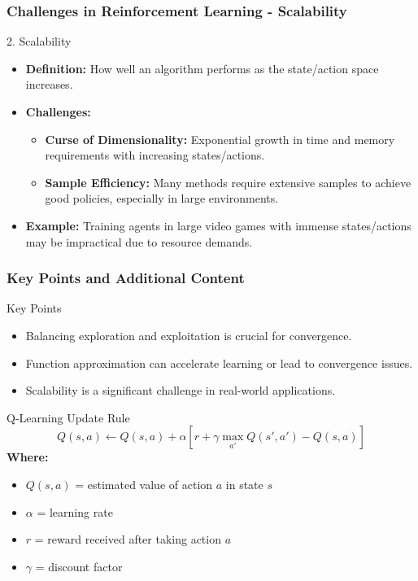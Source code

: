 \documentclass[aspectratio=169]{beamer}
\begin{document}
\begin{frame}[fragile]
    \frametitle{Challenges in Reinforcement Learning - Scalability}
    \begin{block}{2. Scalability}
        \begin{itemize}
            \item \textbf{Definition:} How well an algorithm performs as the state/action space increases.
            \item \textbf{Challenges:}
            \begin{itemize}
                \item \textbf{Curse of Dimensionality:} Exponential growth in time and memory requirements with increasing states/actions.
                \item \textbf{Sample Efficiency:} Many methods require extensive samples to achieve good policies, especially in large environments.
            \end{itemize}
            \item \textbf{Example:} Training agents in large video games with immense states/actions may be impractical due to resource demands.
        \end{itemize}
    \end{block}
\end{frame}

\begin{frame}[fragile]
    \frametitle{Key Points and Additional Content}
    \begin{block}{Key Points}
        \begin{itemize}
            \item Balancing exploration and exploitation is crucial for convergence.
            \item Function approximation can accelerate learning or lead to convergence issues.
            \item Scalability is a significant challenge in real-world applications.
        \end{itemize}
    \end{block}
    
    \begin{block}{Q-Learning Update Rule}
        \begin{equation}
        Q(s, a) \leftarrow Q(s, a) + \alpha \left[ r + \gamma \max_{a'} Q(s', a') - Q(s, a) \right]
        \end{equation}
        \textbf{Where:}
        \begin{itemize}
            \item \( Q(s, a) \) = estimated value of action \( a \) in state \( s \)
            \item \( \alpha \) = learning rate
            \item \( r \) = reward received after taking action \( a \)
            \item \( \gamma \) = discount factor
        \end{itemize}
    \end{block}
\end{frame}
\end{document}
